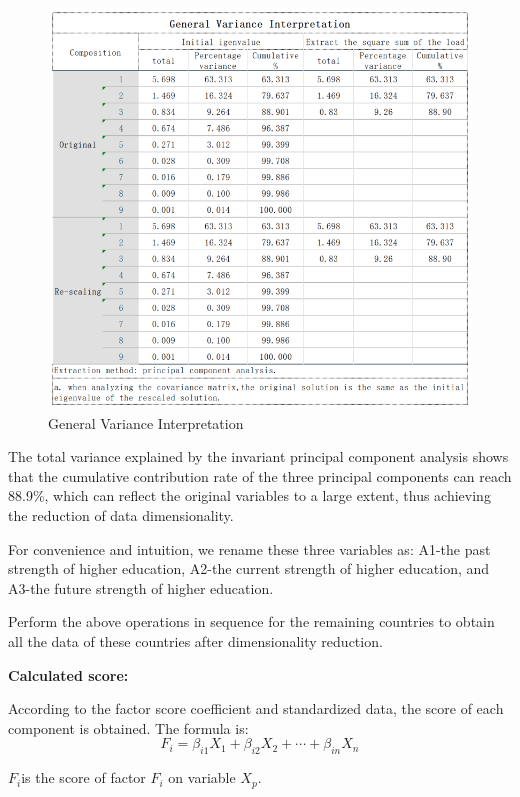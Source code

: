 \documentclass[12pt]{article}  %
\begin{document}
\begin{figure}[h!]
\centering
\includegraphics[scale=0.7]{biao1.png}
\caption{General Variance Interpretation}
\label{fig:GVT}
\end{figure}

The total variance explained by the invariant principal component analysis shows that the cumulative contribution rate of the three principal components can reach 88.9\%, which can reflect the original variables to a large extent, thus achieving the reduction of data dimensionality.

For convenience and intuition, we rename these three variables as: A1-the past strength of higher education, A2-the current strength of higher education, and A3-the future strength of higher education.

Perform the above operations in sequence for the remaining countries to obtain all the data of these countries after dimensionality reduction.

\textbf{Calculated score:}

According to the factor score coefficient and standardized data, the score of each component is obtained. The formula is:
\begin{equation}\label{eq:heat3}F_{i}=\beta_{i 1} X_{1}+\beta_{i 2} X_{2}+\cdots+\beta_{i n} X_{n}\end{equation}

$F_{i}$is the score of factor $F_{i}$ on variable $X_{p}$.
\end{document}
